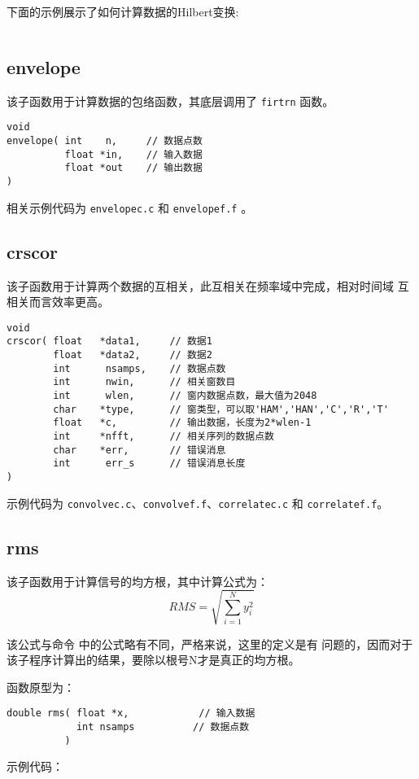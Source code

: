 下面的示例展示了如何计算数据的Hilbert变换:
\inputminted{c}{./libs/firtrn.c}

\subsection{envelope}
该子函数用于计算数据的包络函数，其底层调用了 \texttt{firtrn} 函数。
\begin{verbatim}
void
envelope( int    n,     // 数据点数
          float *in,    // 输入数据
          float *out    // 输出数据
)
\end{verbatim}

相关示例代码为 \texttt{envelopec.c} 和 \texttt{envelopef.f} 。

\subsection{crscor}
该子函数用于计算两个数据的互相关，此互相关在频率域中完成，相对时间域
互相关而言效率更高。

\begin{verbatim}
void
crscor( float   *data1,     // 数据1
        float   *data2,     // 数据2
        int      nsamps,    // 数据点数
        int      nwin,      // 相关窗数目
        int      wlen,      // 窗内数据点数，最大值为2048
        char    *type,      // 窗类型，可以取'HAM','HAN','C','R','T'
        float   *c,         // 输出数据，长度为2*wlen-1
        int     *nfft,      // 相关序列的数据点数
        char    *err,       // 错误消息
        int      err_s      // 错误消息长度
)
\end{verbatim}

示例代码为 \texttt{convolvec.c}、\texttt{convolvef.f}、\texttt{correlatec.c}
和 \texttt{correlatef.f}。

\subsection{rms}
该子函数用于计算信号的均方根，其中计算公式为：
\[
    RMS = \sqrt{\sum_{i=1}^N y_i^2}
\]

该公式与命令  中的公式略有不同，严格来说，这里的定义是有
问题的，因而对于该子程序计算出的结果，要除以根号N才是真正的均方根。

函数原型为：
\begin{verbatim}
double rms( float *x,            // 输入数据
            int nsamps          // 数据点数
          )
\end{verbatim}

示例代码：
\inputminted{c}{./libs/rms.c}
